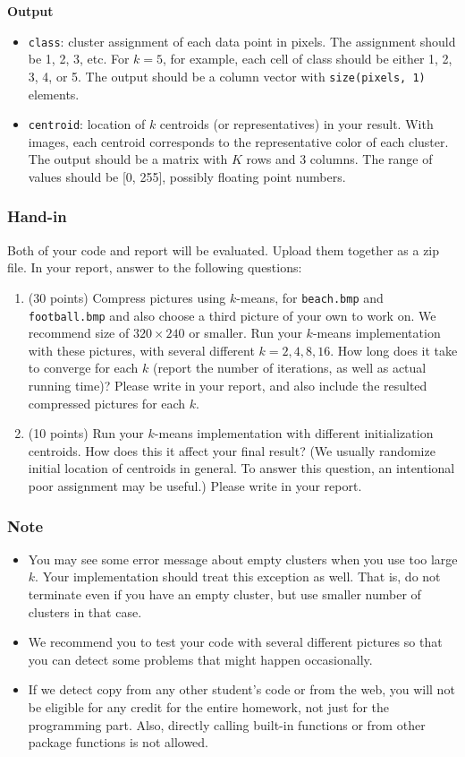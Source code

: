 \documentclass[twoside,10pt]{article}
\begin{document}
\textbf{Output}
\begin{itemize}
  \item \texttt{class}: cluster assignment of each data point in pixels. The assignment should be 1, 2, 3, etc. For $k = 5$, for example, each cell of class should be either 1, 2, 3, 4, or 5. The output should be a column vector with \texttt{size(pixels, 1)} elements.
  \item \texttt{centroid}: location of $k$ centroids (or representatives) in your result. With images, each centroid corresponds to the representative color of each cluster. The output should be a matrix with $K$ rows and 3 columns. The range of values should be [0, 255], possibly floating point numbers.
\end{itemize}

\subsubsection*{Hand-in}
Both of your code and report will be evaluated. Upload them together as a zip file. In your report, answer to the following questions:
\begin{enumerate}
  \item (30 points) Compress pictures using $k$-means, for \texttt{beach.bmp} and \texttt{football.bmp} and also choose a third picture of your own to work on. We recommend size of $320 \times 240$ or smaller. Run your $k$-means implementation with these pictures, with several different $k = 2, 4, 8, 16$. How long does it take to converge for each $k$ (report the number of iterations, as well as actual running time)? Please write in your report, and also include the resulted compressed pictures for each $k$.
  \item (10 points) Run your $k$-means implementation with different initialization centroids. How does this it affect your final result? (We usually randomize initial location of centroids in general. To answer this question, an intentional poor assignment may be useful.) Please write in your report. 
\end{enumerate}


\subsubsection*{Note}
\begin{itemize}
  \item You may see some error message about empty clusters when you use too large $k$. Your implementation should treat this exception as well. That is, do not terminate even if you have an empty cluster, but use smaller number of clusters in that case.

  \item   We recommend you to test your code with several different pictures so that you can detect some problems that might happen occasionally. 

  \item If we detect copy from any other student's code or from the web, you will not be eligible for any credit for the entire homework, not just for the programming part. Also, directly calling built-in functions or from other package functions is not allowed.
\end{itemize}
\end{document}
